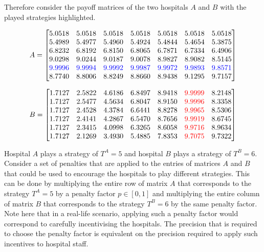 Therefore consider the payoff matrices of the two hospitals \(A\) and \(B\)
with the played strategies highlighted.


\begin{equation*}
    A = 
    \begin{bmatrix}
        5.0518 & 5.0518 & 5.0518 & 5.0518 & 5.0518 &
        5.0518 & 5.0518 \\
        5.4989 & 5.4977 & 5.4960 & 5.4924 & 5.4844 &
        5.4654 & 5.3875 \\
        6.8232  & 6.8192 & 6.8150 & 6.8065 & 6.7871  &
        6.7334 & 6.4906 \\
        9.0298 & 9.0244 & 9.0187 & 9.0078 & 8.9827 &
        8.9082 & 8.5145 \\
        \color{blue}{9.9996} & \color{blue}{9.9994} & \color{blue}{9.9992} & 
        \color{blue}{9.9987} & \color{blue}{9.9972} & \color{blue}{9.9893} & 
        \color{blue}{9.8571} \\
        8.7740 & 8.8006 & 8.8249 & 8.8660 & 8.9438 &
        9.1295 & 9.7157
    \end{bmatrix}
\end{equation*}

\begin{equation*}
    B = 
    \begin{bmatrix}
        1.7127 & 2.5822 & 4.6186 & 6.8497 & 8.9418 &
        \color{red}{9.9999} & 8.2148 \\
        1.7127 & 2.5477 & 4.5634 & 6.8047 & 8.9150  &
        \color{red}{9.9996} & 8.3358 \\
        1.7127 & 2.4528    & 4.3784 & 6.6441 & 8.8278 &
        \color{red}{9.9965} & 8.5306 \\
        1.7127 & 2.4141 & 4.2867 & 6.5470 & 8.7656 &
        \color{red}{9.9919} & 8.6745 \\
        1.7127 & 2.3415 & 4.0998 & 6.3265 & 8.6058 &
        \color{red}{9.9716} & 8.9634 \\
        1.7127 & 2.1269 & 3.4930 & 5.4885 & 7.8353 &
        \color{red}{9.7075} & 9.7322 \\
    \end{bmatrix}
\end{equation*}

Hospital \(A\) plays a strategy of \(T^A = 5\) and hospital \(B\) plays a
strategy of \(T^B = 6\).
Consider a set of penalties that are applied to the entries of matrices \(A\)
and \(B\) that could be used to encourage the hospitals to play different
strategies.
This can be done by multiplying the entire row of matrix \(A\) that
corresponds to the strategy \(T^A = 5\) by a penalty factor \(p \in [0, 1]\)
and multiplying the entire column of matrix \(B\) that corresponds to the
strategy \(T^B = 6\) by the same penalty factor.
Note here that in a real-life scenario, applying such a penalty factor would
correspond to carefully incentivising the hospitals.
The precision that is required to choose the penalty factor is equivalent on
the precision required to apply such incentives to hospital staff.

